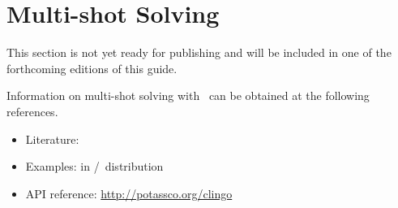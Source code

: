 \section{Multi-shot Solving}\label{sec:multi}

This section is not yet ready for publishing
and will be included in one of the forthcoming editions of this guide.

Information on multi-shot solving with \clingo\ can be obtained at the following references.

\begin{itemize}
\item Literature: \cite{kascwa17a,gekakasc17a}
\item Examples:  in \gringo/\clingo\ distribution
\item API reference: \url{http://potassco.org/clingo}
\end{itemize}



% 

% 


